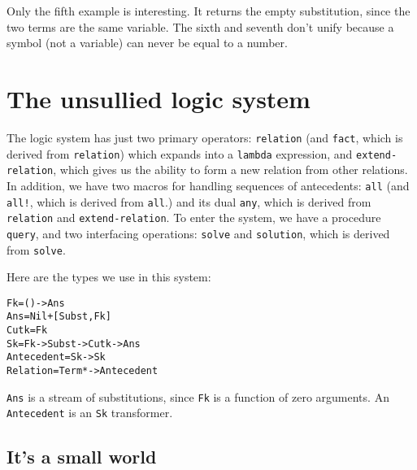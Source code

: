 Only the fifth example is interesting.  It returns the empty
substitution, since the two terms are the same variable.  The sixth
and seventh don't unify because a symbol (not a variable) can never be
equal to a number.

\section{The unsullied logic system}

The logic system has just two primary operators: \texttt{relation}
(and \texttt{fact}, which is derived from \texttt{relation}) which
expands into a \texttt{lambda} expression, and
\texttt{extend-relation}, which gives us the ability to form a new
relation from other relations.  In addition, we have two macros for
handling sequences of antecedents: \texttt{all} (and \texttt{all!},
which is derived from \texttt{all}.)  and its dual \texttt{any}, which
is derived from \texttt{relation} and \texttt{extend-relation}.  To
enter the system, we have a procedure \texttt{query}, and two
interfacing operations: \texttt{solve} and \texttt{solution}, which is
derived from \texttt{solve}.

Here are the types we use in this system:

\begin{alltt}
                  Fk = () -> Ans
                 Ans = Nil + [Subst,Fk]
                Cutk = Fk
                  Sk = Fk -> Subst -> Cutk -> Ans
          Antecedent = Sk -> Sk
            Relation = Term* -> Antecedent
\end{alltt}

\texttt{Ans} is a stream of substitutions, since \texttt{Fk} is a
function of zero arguments. An \texttt{Antecedent} is an \texttt{Sk}
transformer. 

\subsection{It's a small world}

